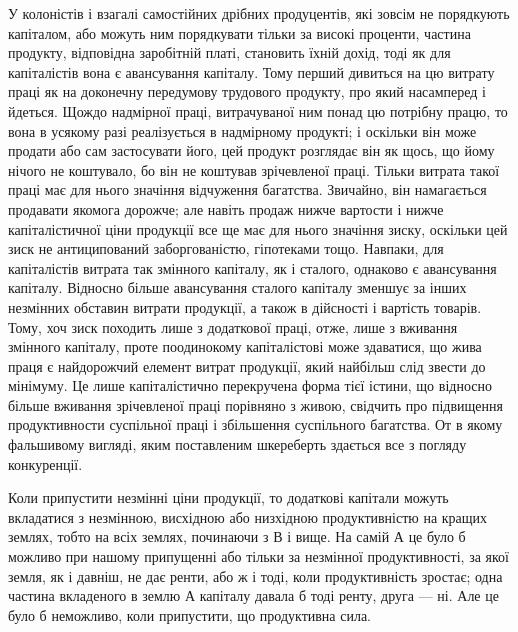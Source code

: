У колоністів і взагалі самостійних дрібних продуцентів, які зовсім не
порядкують капіталом, або можуть ним порядкувати тільки за високі проценти,
частина продукту, відповідна заробітній платі, становить їхній дохід, тоді як
для капіталістів вона є авансування капіталу. Тому перший дивиться на цю
витрату праці як на доконечну передумову трудового продукту, про який насамперед
і йдеться. Щождо надмірної праці, витрачуваної ним понад цю потрібну
працю, то вона в усякому разі реалізується в надмірному продукті; і оскільки
він може продати або сам застосувати його, цей продукт розглядає він як
щось, що йому нічого не коштувало, бо він не коштував зрічевленої праці.
Тільки витрата такої праці має для нього значіння відчуження багатства. Звичайно,
він намагається продавати якомога дорожче; але навіть продаж нижче
вартости і нижче капіталістичної ціни продукції все ще має для нього значіння
зиску, оскільки цей зиск не антиципований заборгованістю, гіпотеками тощо.
Навпаки, для капіталістів витрата так змінного капіталу, як і сталого, однаково
є авансування капіталу. Відносно більше авансування сталого капіталу
зменшує за інших незмінних обставин витрати продукції, а також в дійсності і
вартість товарів. Тому, хоч зиск походить лише з додаткової праці, отже, лише
з вживання змінного капіталу, проте поодинокому капіталістові може здаватися,
що жива праця є найдорожчий елемент витрат продукції, який найбільш слід звести
до мінімуму. Це лише капіталістично перекручена форма тієї істини, що відносно
більше вживання зрічевленої праці порівняно з живою, свідчить про підвищення
продуктивности суспільної праці і збільшення суспільного багатства. От в якому фальшивому
вигляді, яким поставленим шкереберть здається все з погляду конкуренції.

Коли припустити незмінні ціни продукції, то додаткові капітали можуть
вкладатися з незмінною, висхідною або низхідною продуктивністю на кращих
землях, тобто на всіх землях, починаючи з В і вище. На самій А це було б
можливо при нашому припущенні або тільки за незмінної продуктивності, за
якої земля, як і давніш, не дає ренти, або ж і тоді, коли продуктивність зростає;
одна частина вкладеного в землю А капіталу давала б тоді ренту,
друга — ні. Але це було б неможливо, коли припустити, що продуктивна сила.
